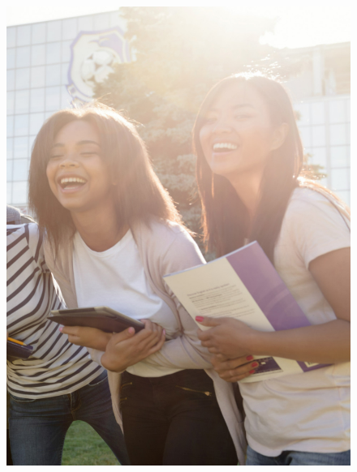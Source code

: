 \begin{figure}[htpb]
\vspace*{-2.5cm}
\hspace{-3cm}\includegraphics[height=\paperheight]{../separadores/separadorING9B.png}
\end{figure}
\setcounter{chapter}{0}



